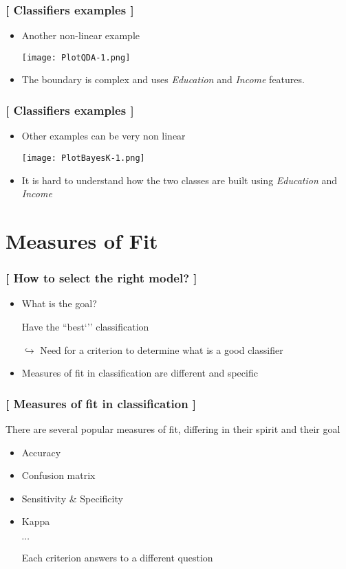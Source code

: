 \documentclass[xcolor=x11names,compress, handhouts]{beamer}
\renewcommand{\(}{\begin{columns}}
\renewcommand{\)}{\end{columns}}
\newcommand{\<}[1]{\begin{column}{#1}}
\renewcommand{\>}{\end{column}}
\begin{document}
\begin{frame} %
\frametitle{\textcolor{brique}{[ Classifiers examples ]}}
\pause
\begin{itemize}[<+->]
  \item Another non-linear example
  \item[] \begin{center}\texttt{[image: PlotQDA-1.png]} \end{center}
  \item The boundary is  complex and uses \textit{Education}  and \textit{Income} features.
\end{itemize}
\end{frame}


\begin{frame} %
\frametitle{\textcolor{brique}{[ Classifiers examples ]}}
\pause
\begin{itemize}[<+->]
  \item Other examples can be very non linear
  \item[] \begin{center}\texttt{[image: PlotBayesK-1.png]} \end{center}
  \item It is hard to understand how the two classes  are built using \textit{Education}  and \textit{Income}
\end{itemize}
\end{frame}


\section{Measures of Fit}

\begin{frame} %
\frametitle{\textcolor{brique}{[ How to select the right model?  ]}}
\pause
\begin{itemize}[<+->]
  \item What is the goal?
  \item[] Have the ``best`'' classification
  \item[$\hookrightarrow$] Need for a criterion to determine what is a good classifier
  \item Measures of fit in classification are different and specific
\end{itemize}
\end{frame}

\begin{frame} %
\frametitle{\textcolor{brique}{[ Measures of fit in classification ]}}
There are several popular measures of fit, differing in their spirit and their goal
\pause
\begin{itemize}[<+->]
  \item Accuracy
  \item Confusion matrix
  \item Sensitivity  \&  Specificity
  \item Kappa
  \item[]$\cdots$
  \item[] Each criterion answers to a different question
\end{itemize}
\end{frame}
\end{document}
